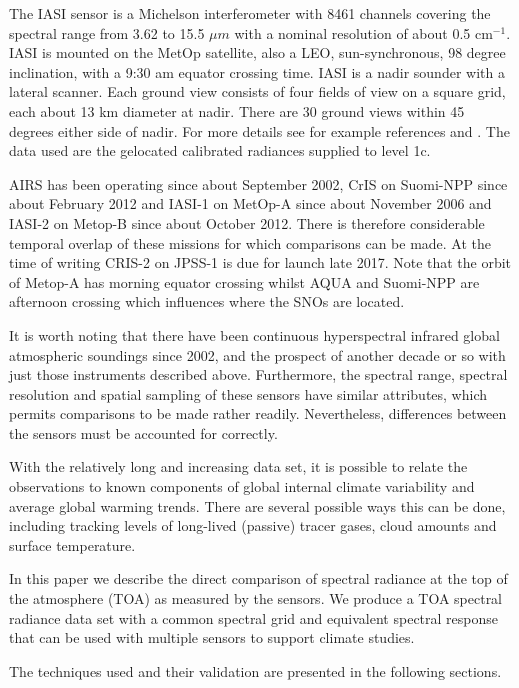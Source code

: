 \documentclass[twocolumn,10pt]{article}
\begin{document}
The IASI sensor is a Michelson interferometer with 8461 channels covering the spectral range from 3.62 to 15.5 $\mu m$ with a nominal resolution of about 0.5 cm$^{-1}$. IASI is mounted on the MetOp satellite, also a LEO, sun-synchronous, 98 degree inclination, with a 9:30 am equator crossing time. IASI is a nadir sounder with a lateral scanner. Each ground view consists of four fields of view on a square grid, each about 13 km diameter at nadir. There are 30 ground views within 45 degrees either side of nadir. For more details see for example references \cite{iasiweb} and \cite{iasiover}. The data used are the gelocated calibrated radiances supplied to level 1c.

AIRS has been operating since about September 2002, CrIS on Suomi-NPP since about February 2012 and IASI-1 on MetOp-A since about November 2006 and IASI-2 on Metop-B since about October 2012. There is therefore considerable temporal overlap of these missions for which comparisons can be made. At the time of writing CRIS-2 on JPSS-1 is due for launch late 2017. Note that the orbit of Metop-A has morning equator crossing whilst AQUA and Suomi-NPP are afternoon crossing which influences where the SNOs are located.

It is worth noting that there have been continuous hyperspectral infrared global atmospheric soundings since 2002, and the prospect of another decade or so with just those instruments described above. Furthermore, the spectral range, spectral resolution and spatial sampling of these sensors have similar attributes, which permits comparisons to be made rather readily. Nevertheless, differences between the sensors must be accounted for correctly.

With the relatively long and increasing data set, it is possible to relate the  observations to known components of global internal climate variability and average global warming trends. There are several possible ways this can be done, including tracking levels of long-lived (passive) tracer gases, cloud amounts and surface temperature. 

In this paper we describe the direct comparison of spectral radiance at the top of the atmosphere (TOA) as measured by the sensors. We produce a TOA spectral radiance data set with a common spectral grid and equivalent spectral response that can be used with multiple sensors to support climate studies.

The techniques used and their validation are presented in the following sections.  
\end{document}

